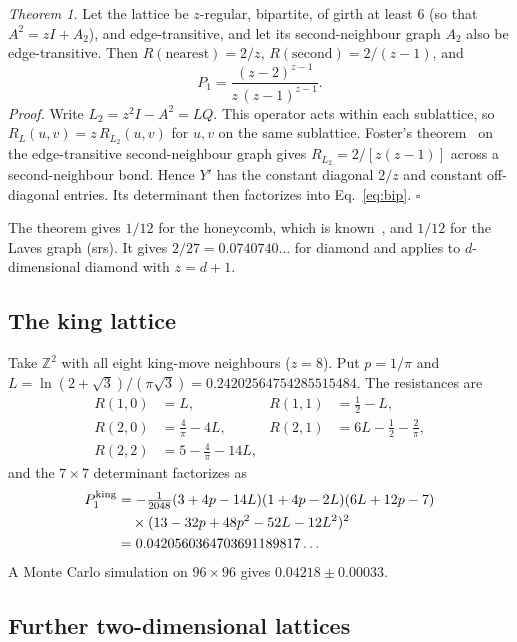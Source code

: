 \documentclass[aps,pre,10pt,twocolumn,superscriptaddress,nofootinbib]{revtex4-2}
\newcommand{\sq}{\sqrt{3}}
\begin{document}
\emph{Theorem 1.} Let the lattice be $z$-regular, bipartite, of girth at least 6 (so that
$A^2=zI+A_2$), and edge-transitive, and let its second-neighbour graph $A_2$ also be edge-transitive.
Then $R(\text{nearest})=2/z$, $R(\text{second})=2/(z-1)$, and
\begin{equation}
P_1=\frac{(z-2)^{z-1}}{z\,(z-1)^{z-1}} .
\label{eq:bip}
\end{equation}
\emph{Proof.} Write $L_2=z^2I-A^2=LQ$. This operator acts within each sublattice, so
$R_L(u,v)=z\,R_{L_2}(u,v)$ for $u,v$ on the same sublattice. Foster's theorem~\cite{Foster1949} on
the edge-transitive second-neighbour graph gives $R_{L_2}=2/[z(z-1)]$ across a second-neighbour bond.
Hence $Y'$ has the constant diagonal $2/z$ and constant off-diagonal entries. Its determinant then
factorizes into Eq.~\eqref{eq:bip}. $\square$

The theorem gives $1/12$ for the honeycomb, which is known~\cite{AzimiTafreshi2010}, and $1/12$ for
the Laves graph (srs). It gives $2/27=0.0740740\ldots$ for diamond and applies to $d$-dimensional
diamond with $z=d+1$.

\subsection{The king lattice}

Take $\mathbb{Z}^2$ with all eight king-move neighbours ($z=8$). Put $p=1/\pi$ and
$L=\ln(2+\sq)/(\pi\sq)=0.24202564754285515484$. The resistances are
\begin{align}
R(1,0)&=L, & R(1,1)&=\tfrac12-L,\nonumber\\
R(2,0)&=\tfrac4\pi-4L, & R(2,1)&=6L-\tfrac12-\tfrac2\pi,\nonumber\\
R(2,2)&=5-\tfrac4\pi-14L,
\end{align}
and the $7\times7$ determinant factorizes as
\begin{align}
P_1^{\rm king}&=-\tfrac1{2048}(3+4p-14L)(1+4p-2L)(6L+12p-7)\nonumber\\
&\quad\times(13-32p+48p^2-52L-12L^2)^2\nonumber\\
&=0.0420560364703691189817\ldots
\end{align}
A Monte Carlo simulation on $96\times96$ gives $0.04218\pm0.00033$.

\subsection{Further two-dimensional lattices}
\end{document}
